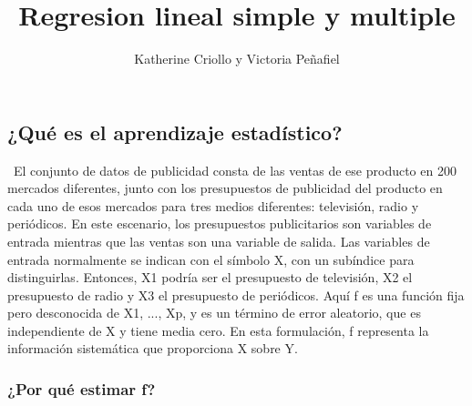 \documentclass[
  letterpaper,
  DIV=11,
  numbers=noendperiod]{scrartcl}
\title{Regresion lineal simple y multiple}
\author{Katherine Criollo y Victoria Peñafiel}
\date{}
\begin{document}
\maketitle
\ifdefined\Shaded\renewenvironment{Shaded}{\begin{tcolorbox}[sharp corners, interior hidden, boxrule=0pt, borderline west={3pt}{0pt}{shadecolor}, frame hidden, enhanced, breakable]}{\end{tcolorbox}}\fi

\hypertarget{quuxe9-es-el-aprendizaje-estaduxedstico}{%
\subsection{\texorpdfstring{\textbf{¿Qué es el aprendizaje
estadístico?}}{¿Qué es el aprendizaje estadístico?}}\label{quuxe9-es-el-aprendizaje-estaduxedstico}}

~El conjunto de datos de publicidad consta de las ventas de ese producto
en 200 mercados diferentes, junto con los presupuestos de publicidad del
producto en cada uno de esos mercados para tres medios diferentes:
televisión, radio y periódicos. En este escenario, los presupuestos
publicitarios son variables de entrada mientras que las ventas son una
variable de salida. Las variables de entrada normalmente se indican con
el símbolo X, con un subíndice para distinguirlas. Entonces, X1 podría
ser el presupuesto de televisión, X2 el presupuesto de radio y X3 el
presupuesto de periódicos. Aquí f es una función fija pero desconocida
de X1, ..., Xp, y es un término de error aleatorio, que es independiente
de X y tiene media cero. En esta formulación, f representa la
información sistemática que proporciona X sobre Y.

\hypertarget{por-quuxe9-estimar-f}{%
\subsubsection{\texorpdfstring{\textbf{¿Por qué estimar
f?}}{¿Por qué estimar f?}}\label{por-quuxe9-estimar-f}}
\end{document}
